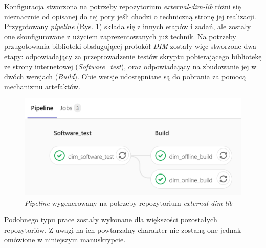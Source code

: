 Konfiguracja stworzona na potrzeby repozytorium \textit{external-dim-lib} różni się nieznacznie od opisanej do tej pory jeśli chodzi o techniczną stronę jej realizacji. Przygotowany \textit{pipeline} (Rys. \ref{fig:pipelineDIM}) składa się z innych etapów i zadań, ale zostały one skonfigurowane z użyciem zaprezentowanych już technik. Na potrzeby przugotowania biblioteki obsługującej protokół \textit{DIM} zostały więc stworzone dwa etapy: odpowiadający za przeprowadzenie testów skryptu pobierającego bibliotekę ze strony internetowej (\textit{Software\_test}), oraz odpowiadający na zbudowanie jej w dwóch wersjach (\textit{Build}). Obie wersje udostępniane są do pobrania za pomocą mechanizmu artefaktów.  

\begin{figure}[H]
\centering
\caption{\textit{Pipeline} wygenerowany na potrzeby repozytorium \textit{external-dim-lib}}
\label{fig:pipelineDIM}
\includegraphics[width=\textwidth]{res/png/pipelineDIM}
\end{figure}

Podobnego typu prace zostały wykonane dla większości pozostałych repozytoriów. Z uwagi na ich powtarzalny charakter nie zostaną one jednak omówione w niniejszym manuskrypcie. 

